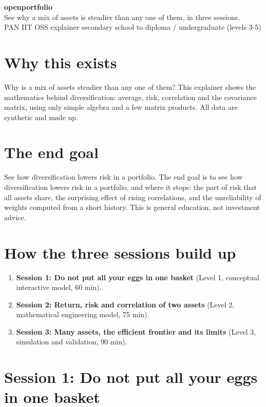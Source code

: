 \documentclass[11pt,a4paper]{article}
\begin{document}
\begin{center}{\LARGE\bfseries openportfolio}\\[0.4em]{\large See why a mix of assets is steadier than any one of them, in three sessions.}\\[0.2em]\small PAN IIT OSS explainer \textbullet{} secondary school to diploma / undergraduate (levels 3-5)\end{center}

\section*{Why this exists}
Why is a mix of assets steadier than any one of them? This explainer shows the mathematics behind diversification: average, risk, correlation and the covariance matrix, using only simple algebra and a few matrix products. All data are synthetic and made up.

\section*{The end goal}
See how diversification lowers risk in a portfolio. The end goal is to see how diversification lowers risk in a portfolio, and where it stops: the part of risk that all assets share, the surprising effect of rising correlations, and the unreliability of weights computed from a short history. This is general education, not investment advice.

\section*{How the three sessions build up}
\begin{enumerate}[nosep]
\item \textbf{Session 1: Do not put all your eggs in one basket} (Level 1, conceptual interactive model, 60 min).
\item \textbf{Session 2: Return, risk and correlation of two assets} (Level 2, mathematical engineering model, 75 min).
\item \textbf{Session 3: Many assets, the efficient frontier and its limits} (Level 3, simulation and validation, 90 min).
\end{enumerate}

\section{Session 1: Do not put all your eggs in one basket}
\end{document}
